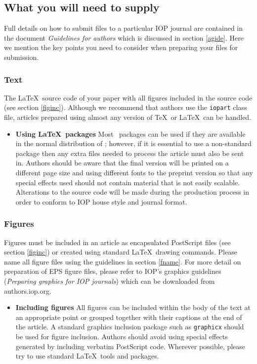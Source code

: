 \documentclass[12pt]{iopart}
\newcommand{\gguide}{{\it Preparing graphics for IOP journals}}
\begin{document}
\subsection{What you will need to supply}
Full details on how to submit files to a particular IOP journal are contained in the document {\it Guidelines for authors} which is discussed in section \ref{agide}. Here we mention the key points you need to consider when preparing your files for submission. 

\subsubsection{{\bf Text}} The \LaTeX\ source code of your paper with all figures included in 
the source code (see section \ref{figinc}). Although we recommend that authors use the \verb"iopart" class file, articles prepared using almost any  version of \TeX\ or \LaTeX\ 
can be handled.  
\begin{itemize}
\item {\bf Using \LaTeX\ packages} Most \LaTeXe\ packages can be used if they are 
available in the normal distribution of \LaTeXe; however, if it is essential to use 
a non-standard package then any extra files needed to process the article must 
also be sent in. Authors should be aware that the final version will be printed on 
a different page size and using different fonts to the preprint version so that any 
special effects used should not contain material that is not easily scalable.
Alterations to the source code will be made during the production process in order to 
conform to IOP house style and journal format.
\end{itemize}
\subsubsection{\bf Figures} Figures must be included in an article as encapsulated PostScript files
(see section \ref{figinc}) or created using standard \LaTeX\ drawing commands. 
 Please name all figure files using the guidelines in section \ref{fname}. For more detail
on preparation of EPS figure files, please refer to IOP's graphics guidelines (\gguide) 
which can be downloaded from authors.iop.org.

\begin{itemize}
\item {\bf Including figures\label{fig1}} All figures can be included within the body of the text 
at an appropriate point or grouped together with their captions at the end of the article. A standard graphics inclusion package such as \verb"graphicx" should be used for figure inclusion.
Authors should avoid using special effects generated by including verbatim
PostScript code. Wherever possible, please try to use standard \LaTeX\ tools 
and packages.
\end{itemize}
\end{document}
